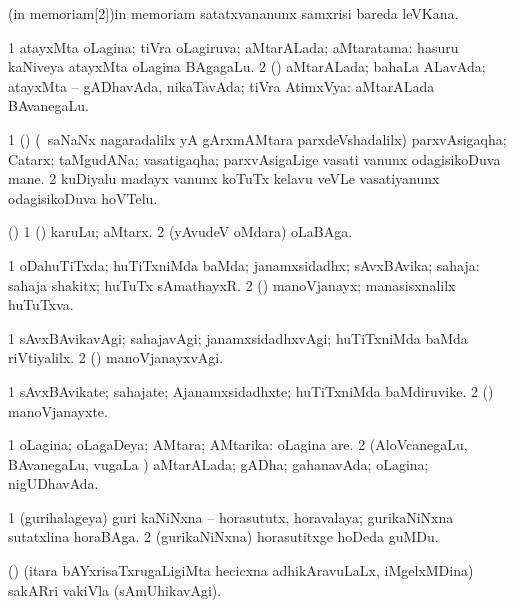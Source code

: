 \bentry
\wordf(in memoriam[2]){in memoriam}
\gl{\nA}
\expl{\Latin }
\bmng
satatxvananunx samxrisi bareda leVKana. 
\emng
\eentry

\bentry
{}
\gl{\gu}
\bmng
\bnum
\num{1} atayxMta oLagina; tiVra oLagiruva; aMtarALada; aMtaratama:  hasuru kaNiveya atayxMta oLagina BAgagaLu. 
\num{2} (\rUpa) aMtarALada; bahaLa ALavAda; atayxMta -- gADhavAda, nikaTavAda; tiVra AtimxVya:  aMtarALada BAvanegaLu. 
\enum
\emng
\eentry

\bentry
{}
\gl{\nA}
\bmng
\bnum
\num{1} (\ca) (\sA\ saNaNx nagaradalilx yA gArxmAMtara parxdeVshadalilx) parxvAsigaqha; Catarx; taMgudANa; vasatigaqha; parxvAsigaLige vasati \mo vanunx odagisikoDuva mane. 
\num{2} kuDiyalu madayx \mo vanunx koTuTx kelavu veVLe vasatiyanunx odagisikoDuva hoVTelu. 
\enum
\emng
\eentry

\bentry
{}
\gl{\nA}
\bmng
(\bava) 
\bnum
\num{1} (\AmA) karuLu; aMtarx. 
\num{2} (yAvudeV oMdara) oLaBAga. 
\enum
\emng
\eentry

\bentry
{}
\gl{\gu}
\bmng
\bnum
\num{1} oDahuTiTxda; huTiTxniMda baMda; janamxsidadhx; sAvxBAvika; sahaja:  sahaja shakitx; huTuTx sAmathayxR. 
\num{2} (\tashA) manoVjanayx; manasisxnalilx huTuTxva. 
\enum
\emng
\eentry

\bentry
{}
\gl{\kirxvi}
\bmng
\bnum
\num{1} sAvxBAvikavAgi; sahajavAgi; janamxsidadhxvAgi; huTiTxniMda baMda riVtiyalilx. 
\num{2} (\tashA) manoVjanayxvAgi. 
\enum
\emng
\eentry

\bentry
{}
\gl{\nA}
\bmng
\bnum
\num{1} sAvxBAvikate; sahajate; Ajanamxsidadhxte; huTiTxniMda baMdiruvike. 
\num{2} (\tashA) manoVjanayxte. 
\enum
\emng
\eentry

\bentry
{}
\gl{\gu}
\bmng
\bnum
\num{1} oLagina; oLagaDeya; AMtara; AMtarika:  oLagina are. 
\num{2} (AloVcanegaLu, BAvanegaLu, \mo vugaLa \vi) aMtarALada; gADha; gahanavAda; oLagina; nigUDhavAda. 
\enum
\emng
\eentry

\bentry
{}
\gl{\nA}
\bmng
\bnum
\num{1} (gurihalageya) guri kaNiNxna -- horasututx, horavalaya; gurikaNiNxna sutatxlina horaBAga. 
\num{2} (gurikaNiNxna) horasutitxge hoDeda guMDu. 
\enum
\emng
\eentry

\bentry
{}
\gl{\nA}
\bmng
(\birx) (itara bAYxrisaTxrugaLigiMta hecicxna adhikAravuLaLx, iMgelxMDina) sakARri vakiVla (sAmUhikavAgi). 
\emng
\eentry

